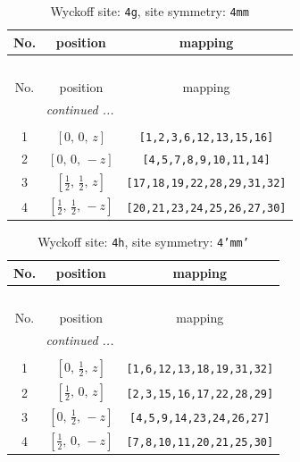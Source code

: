 \documentclass[fleqn,8pt]{jsarticle}
\begin{document}
\renewcommand{\arraystretch}{1.2}
\begin{longtable}{ccc}
\caption{Wyckoff site: {\tt 4g}, site symmetry: {\tt 4mm}}
 \\
 \hline \hline
No. & position & mapping \\ \hline \endfirsthead

\multicolumn{2}{l}{\tablename\ \thetable{}} \\
 \hline \hline
No. & position & mapping \\ \hline \endhead

 \hline \hline
\multicolumn{2}{r}{\footnotesize\it continued ...} \\ \endfoot

 \hline \hline
\multicolumn{2}{r}{} \\ \endlastfoot

1 & $\left[ 0,\, 0,\, z \right]$ & {\tt [1,2,3,6,12,13,15,16]} \\ \hline
2 & $\left[ 0,\, 0,\, - z \right]$ & {\tt [4,5,7,8,9,10,11,14]} \\ \hline
3 & $\left[ \frac{1}{2},\, \frac{1}{2},\, z \right]$ & {\tt [17,18,19,22,28,29,31,32]} \\ \hline
4 & $\left[ \frac{1}{2},\, \frac{1}{2},\, - z \right]$ & {\tt [20,21,23,24,25,26,27,30]} \\
\end{longtable}
\renewcommand{\arraystretch}{1.2}
\begin{longtable}{ccc}
\caption{Wyckoff site: {\tt 4h}, site symmetry: {\tt 4'mm'}}
 \\
 \hline \hline
No. & position & mapping \\ \hline \endfirsthead

\multicolumn{2}{l}{\tablename\ \thetable{}} \\
 \hline \hline
No. & position & mapping \\ \hline \endhead

 \hline \hline
\multicolumn{2}{r}{\footnotesize\it continued ...} \\ \endfoot

 \hline \hline
\multicolumn{2}{r}{} \\ \endlastfoot

1 & $\left[ 0,\, \frac{1}{2},\, z \right]$ & {\tt [1,6,12,13,18,19,31,32]} \\ \hline
2 & $\left[ \frac{1}{2},\, 0,\, z \right]$ & {\tt [2,3,15,16,17,22,28,29]} \\ \hline
3 & $\left[ 0,\, \frac{1}{2},\, - z \right]$ & {\tt [4,5,9,14,23,24,26,27]} \\ \hline
4 & $\left[ \frac{1}{2},\, 0,\, - z \right]$ & {\tt [7,8,10,11,20,21,25,30]} \\
\end{longtable}
\end{document}
